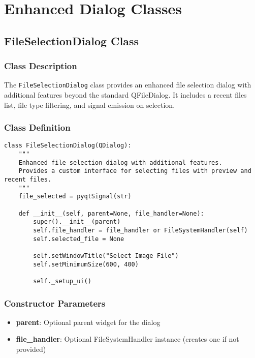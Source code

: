 \section{Enhanced Dialog Classes}

\subsection{FileSelectionDialog Class}

\subsubsection{Class Description}

The \texttt{FileSelectionDialog} class provides an enhanced file selection dialog with additional features beyond the standard QFileDialog. It includes a recent files list, file type filtering, and signal emission on selection.

\subsubsection{Class Definition}

\begin{verbatim}
class FileSelectionDialog(QDialog):
    """
    Enhanced file selection dialog with additional features.
    Provides a custom interface for selecting files with preview and recent files.
    """
    file_selected = pyqtSignal(str)
    
    def __init__(self, parent=None, file_handler=None):
        super().__init__(parent)
        self.file_handler = file_handler or FileSystemHandler(self)
        self.selected_file = None
        
        self.setWindowTitle("Select Image File")
        self.setMinimumSize(600, 400)
        
        self._setup_ui()
\end{verbatim}

\subsubsection{Constructor Parameters}

\begin{itemize}
    \item \textbf{parent}: Optional parent widget for the dialog
    \item \textbf{file\_handler}: Optional FileSystemHandler instance (creates one if not provided)
\end{itemize}

